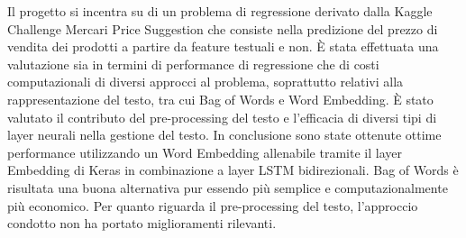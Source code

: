 
Il progetto si incentra su di un problema di regressione derivato dalla Kaggle
Challenge Mercari Price Suggestion che consiste nella predizione del prezzo di
vendita dei prodotti a partire da feature testuali e non. È stata effettuata una
valutazione sia in termini di performance di regressione che di costi
computazionali di diversi approcci al problema, soprattutto relativi alla
rappresentazione del testo, tra cui Bag of Words e Word Embedding. È stato
valutato il contributo del pre-processing del testo e l'efficacia di diversi
tipi di layer neurali nella gestione del testo. In conclusione sono state
ottenute ottime performance utilizzando un Word Embedding allenabile tramite il
layer Embedding di Keras in combinazione a layer LSTM bidirezionali. Bag of
Words è risultata una buona alternativa pur essendo più semplice e
computazionalmente più economico. Per quanto riguarda il pre-processing del
testo, l'approccio condotto non ha portato miglioramenti rilevanti.